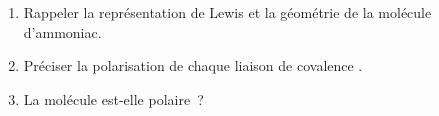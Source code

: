 \begin{enumerate}
    \item Rappeler la représentation de Lewis et la géométrie de la molécule
          d'ammoniac.
    \item Préciser la polarisation de chaque liaison de covalence .
    \item La molécule est-elle polaire~?
\end{enumerate}

